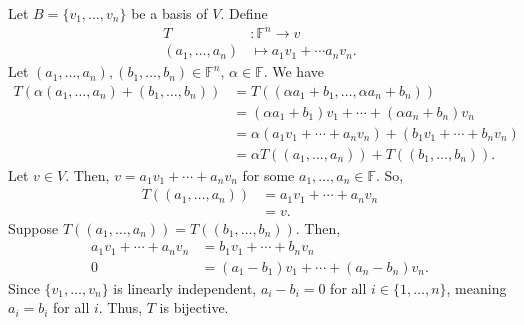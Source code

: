 \documentclass[8pt]{extarticle}
\begin{document}
  Let $B = \{v_1,\dots,v_n\}$ be a basis of $V$. Define
  \begin{align*}
    T&: \mathbb{F}^{n}\rightarrow v\\
    (a_1,\dots,a_n)&\mapsto a_1v_1 + \cdots a_nv_n.
  \end{align*}
  Let $(a_1,\dots,a_n),(b_1,\dots,b_n)\in \mathbb{F}^{n}$, $\alpha\in \mathbb{F}$. We have
  \begin{align*}
    T\left(\alpha(a_1,\dots,a_n) + (b_1,\dots,b_n)\right) &= T\left((\alpha a_1 + b_1,\dots,\alpha a_n + b_n)\right)\\
                                                          &= (\alpha a_1 + b_1)v_1 + \cdots + (\alpha a_n + b_n)v_n\\
                                                          &= \alpha (a_1v_1 + \cdots + a_nv_n) + (b_1v_1 + \cdots + b_nv_n)\\
                                                          &= \alpha T((a_1,\dots,a_n)) + T((b_1,\dots,b_n)).
  \end{align*}
  Let $v\in V$. Then, $v = a_1v_1 + \cdots + a_nv_n$ for some $a_1,\dots,a_n\in \mathbb{F}$. So,
  \begin{align*}
    T((a_1,\dots,a_n)) &= a_1v_1 + \cdots + a_nv_n\\
                       &= v.
  \end{align*}
  Suppose $T((a_1,\dots,a_n)) = T((b_1,\dots,b_n))$. Then,
  \begin{align*}
    a_1v_1 + \cdots + a_nv_n &= b_1v_1 + \cdots + b_nv_n\\
    0 &= (a_1-b_1)v_1 + \cdots + (a_n-b_n)v_n.
  \end{align*}
  Since $\{v_1,\dots,v_n\}$ is linearly independent, $a_i-b_i = 0$ for all $i\in \{1,\dots,n\}$, meaning $a_i = b_i$ for all $i$. Thus, $T$ is bijective.
\end{document}
